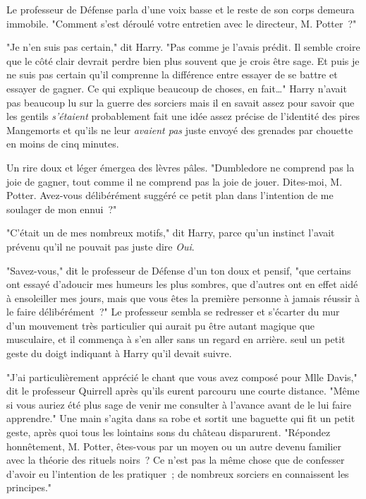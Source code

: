 Le professeur de Défense parla d'une voix basse et le reste de son corps demeura immobile. "Comment s'est déroulé votre entretien avec le directeur, M. Potter~?"

"Je n'en suis pas certain," dit Harry. "Pas comme je l'avais prédit. Il semble croire que le côté clair devrait perdre bien plus souvent que je crois être sage. Et puis je ne suis pas certain qu'il comprenne la différence entre essayer de se battre et essayer de gagner. Ce qui explique beaucoup de choses, en fait…" Harry n'avait pas beaucoup lu sur la guerre des sorciers mais il en savait assez pour savoir que les gentils \emph{s'étaient} probablement fait une idée assez précise de l'identité des pires Mangemorts et qu'ils ne leur \emph{avaient pas} juste envoyé des grenades par chouette en moins de cinq minutes.

Un rire doux et léger émergea des lèvres pâles. "Dumbledore ne comprend pas la joie de gagner, tout comme il ne comprend pas la joie de jouer. Dites-moi, M. Potter. Avez-vous délibérément suggéré ce petit plan dans l'intention de me soulager de mon ennui~?"

"C'était un de mes nombreux motifs," dit Harry, parce qu'un instinct l'avait prévenu qu'il ne pouvait pas juste dire \emph{Oui}.

"Savez-vous," dit le professeur de Défense d'un ton doux et pensif, "que certains ont essayé d'adoucir mes humeurs les plus sombres, que d'autres ont en effet aidé à ensoleiller mes jours, mais que vous êtes la première personne à jamais réussir à le faire délibérément~?" Le professeur sembla se redresser et s'écarter du mur d'un mouvement très particulier qui aurait pu être autant magique que musculaire, et il commença à s'en aller sans un regard en arrière. seul un petit geste du doigt indiquant à Harry qu'il devait suivre.

"J'ai particulièrement apprécié le chant que vous avez composé pour Mlle Davis," dit le professeur Quirrell après qu'ils eurent parcouru une courte distance. "Même si vous auriez été plus sage de venir me consulter à l'avance avant de le lui faire apprendre." Une main s'agita dans sa robe et sortit une baguette qui fit un petit geste, après quoi tous les lointains sons du château disparurent. "Répondez honnêtement, M. Potter, êtes-vous par un moyen ou un autre devenu familier avec la théorie des rituels noirs~? Ce n'est pas la même chose que de confesser d'avoir eu l'intention de les pratiquer~; de nombreux sorciers en connaissent les principes."

